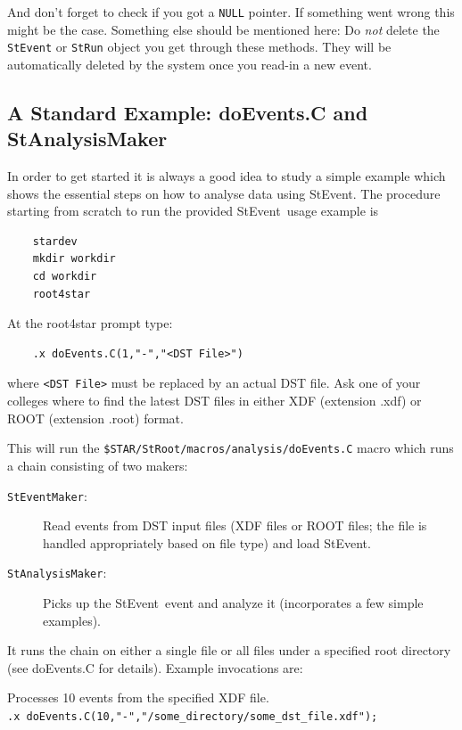 \documentclass[twoside]{article}
\newcommand{\StEvent}{\textsf{StEvent}}
\begin{document}
And don't forget to check if you got a \texttt{NULL} pointer. If
something went wrong this might be the case. Something else should be
mentioned here: Do \emph{not} delete the \texttt{StEvent} or
\texttt{StRun} object you get through these methods.  They will be
automatically deleted by the system once you read-in a new event.
\vfill

\subsection{A Standard Example: doEvents.C and StAnalysisMaker}
\label{sec:doEvents}
  
  

In order to get started it is always a good idea to study a simple
example which shows the essential steps on how to analyse data using
\StEvent.  The procedure starting from scratch to run the provided
\StEvent\ usage example is
\begin{verbatim}
    stardev
    mkdir workdir
    cd workdir
    root4star
\end{verbatim}
At the root4star prompt type:
\begin{verbatim}
    .x doEvents.C(1,"-","<DST File>")
\end{verbatim}
where \texttt{<DST File>} must be replaced by an actual DST file. Ask
one of your colleges where to find the latest DST files in either XDF
(extension .xdf) or ROOT (extension .root) format.

This will run the \texttt{\$STAR/StRoot/macros/analysis/doEvents.C}
macro which runs a chain consisting of two makers:
\begin{description}
\item[\texttt{StEventMaker}:] Read events from DST input files (XDF
    files or ROOT files; the file is handled appropriately based on
    file type) and load \StEvent.
\item[\texttt{StAnalysisMaker}:] Picks up the \StEvent\ event and
    analyze it (incorporates a few simple examples).
\end{description}
It runs the chain on either a single file or all files under a
specified root directory (see doEvents.C for details). Example
invocations are:

Processes 10 events from the specified XDF file.\\
\hspace{1cm}\verb+.x doEvents.C(10,"-","/some_directory/some_dst_file.xdf");+\\
\end{document}
